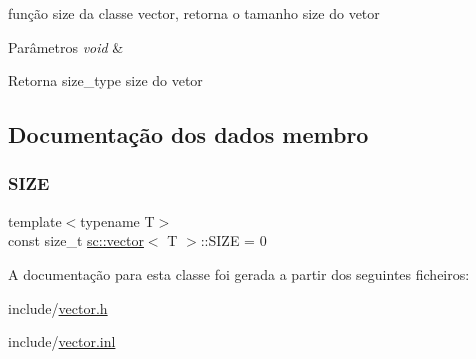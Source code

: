 função size da classe vector, retorna o tamanho size do vetor 
\begin{DoxyParams}{Parâmetros}
{\em void} & \\
\hline
\end{DoxyParams}
\begin{DoxyReturn}{Retorna}
size\+\_\+type size do vetor 
\end{DoxyReturn}


\subsection{Documentação dos dados membro}
\mbox{\label{classsc_1_1vector_a3fadfe198ea4c912fb9ce406ef366a6a}} 
\subsubsection{\texorpdfstring{S\+I\+ZE}{SIZE}}
{\footnotesize\ttfamily template$<$typename T$>$ \\
const size\+\_\+t \mbox{\hyperlink{classsc_1_1vector}{sc\+::vector}}$<$ T $>$\+::S\+I\+ZE = 0\hspace{0.3cm}{\ttfamily [static]}}



A documentação para esta classe foi gerada a partir dos seguintes ficheiros\+:\begin{DoxyCompactItemize}
\item 
include/\mbox{\hyperlink{vector_8h}{vector.\+h}}\item 
include/\mbox{\hyperlink{vector_8inl}{vector.\+inl}}\end{DoxyCompactItemize}
